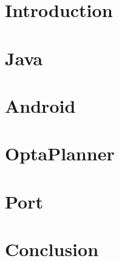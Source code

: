 \chapter{Introduction}


\chapter{Java}


\chapter{Android}\label{AndroidSec}


\chapter{OptaPlanner}


\chapter{Port}


\chapter{Conclusion}


